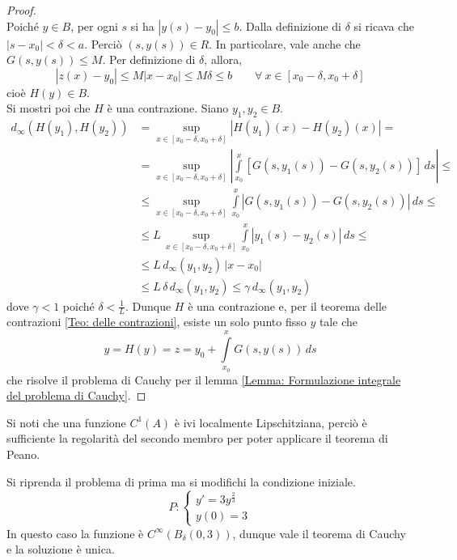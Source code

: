 \begin{proof}
\begin{equation}
\end{equation}
Poiché $y \in B$, per ogni $s$ si ha $|y(s)-y_0|\leq b$. Dalla definizione di $\delta$ si ricava che $|s-x_0|<\delta<a$. Perciò $(s, y(s)) \in R$. In particolare, vale anche che $G(s, y(s)) \leq M$. Per definizione di $\delta$, allora,
\begin{equation}
    |z(x)-y_0|\leq M|x-x_0|\leq M\delta \leq b \qquad \forall\ x \in [x_0-\delta, x_0+\delta]
\end{equation}
cioè $H(y) \in B$.\\
Si mostri poi che $H$ è una contrazione. Siano $y_1, y_2 \in B$.
\begin{equation}
\begin{aligned}
    d_\infty(H(y_1), H(y_2))&= \sup_{x \in [x_0-\delta, x_0+\delta]}{|H(y_1)(x)-H(y_2)(x)|}=\\
    &=\sup_{x \in [x_0-\delta, x_0+\delta]}\left|{\int\limits_{x_0}^{x}{\left[G(s,y_1(s))-G(s, y_2(s))\right]}}\,ds\right| \leq \\
    &\leq \sup_{x \in [x_0-\delta, x_0+\delta]}{\int\limits_{x_0}^{x}{\left|G(s,y_1(s))-G(s, y_2(s))\right|}}\,ds \leq\\
    &\leq L\,  \sup_{x \in [x_0-\delta, x_0+\delta]}{\int\limits_{x_0}^{x}{\left|y_1(s)-y_2(s)\right|}}\,ds\leq\\
    &\leq L \,d_\infty(y_1, y_2)\, |x-x_0| \\
    &\leq L\, \delta\, d_\infty(y_1, y_2) \leq \gamma\, d_\infty(y_1,y_2)
\end{aligned}
\end{equation}
dove $\gamma<1$ poiché $\delta<\tfrac{1}{L}$. Dunque $H$ è una contrazione e, per il teorema delle contrazioni \eqref{Teo: delle contrazioni}, esiste un solo punto fisso $y$ tale che
\begin{equation}
    y=H(y)=z= y_0+ \int\limits_{x_0}^{x}{G(s, y(s))}\,ds
\end{equation}
che risolve il problema di Cauchy per il lemma \ref{Lemma: Formulazione integrale del problema di Cauchy}.
\end{proof}
\begin{oss}
    Si noti che una funzione $C^1(A)$ è ivi localmente Lipschitziana, perciò  è sufficiente la regolarità del secondo membro per poter applicare il teorema di Peano.
\end{oss}
\begin{example}
    Si riprenda il problema di prima ma si modifichi la condizione iniziale.
    \begin{equation*}
        P: \begin{cases}
        y'=3y^{\frac{2}{3}}\\
        y(0)=3
    \end{cases}
    \end{equation*}
    In questo caso la funzione è $C^\infty(B_\delta(0,3))$, dunque vale il teorema di Cauchy e la soluzione è unica.
\end{example}
